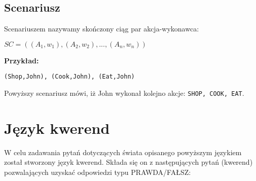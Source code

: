 \documentclass{article}
\begin{document}
\subsection{Scenariusz}
Scenariuszem nazywamy skończony ciąg par akcja-wykonawca:
\begin{center}
$SC=((A_1,w_1),(A_2,w_2),...,(A_n,w_n))$
\end{center}
\textbf{Przykład:}
\begin{lstlisting}[mathescape=true]
(Shop,John), (Cook,John), (Eat,John)
\end{lstlisting}
Powyższy scenariusz mówi, iż John wykonał kolejno akcje: \texttt{SHOP, COOK, EAT}.

\section{Język kwerend}
W celu zadawania pytań dotyczących świata opisanego powyższym językiem został stworzony język kwerend. Składa się on z następujących pytań (kwerend) pozwalających uzyskać odpowiedzi typu PRAWDA/FAŁSZ:
\end{document}
